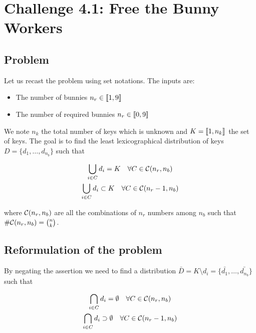 \documentclass[12pt]{article}
\begin{document}
\maketitle


\section{Challenge 4.1: Free the Bunny Workers}

\subsection{Problem}

Let us recast the problem using set notations. The inputs are:

\begin{itemize}
    \item The number of bunnies $n_r \in \llbracket 1, 9 \rrbracket$
    \item The number of required bunnies $n_r \in \llbracket 0, 9 \rrbracket$
\end{itemize}

We note $n_k$ the total number of keys which is unknown and $K = \llbracket 1, n_k \rrbracket$ the set of keys. The goal is to find the least lexicographical distribution of keys $D = \{d_1, \ldots, d_{n_b}\}$ such that

\begin{gather}
    \bigcup_{i \in C} d_i = K \quad \forall C \in \mathcal{C}(n_r, n_b) \\
    \bigcup_{i \in C} d_i \subset K \quad \forall C \in \mathcal{C}(n_r - 1, n_b)
\end{gather}

\noindent where $\mathcal{C}(n_r, n_b)$ are all the combinations of $n_r$ numbers among $n_b$ such that $\#\mathcal{C}(n_r, n_b) = \binom{n}{k}$.

\subsection{Reformulation of the problem}

By negating the assertion we need to find a distribution $\bar{D} = {K \setminus d_i} = \{\bar{d_1}, \ldots, \bar{d_{n_b}}\}$ such that

\begin{gather}
    \bigcap_{i \in C} d_i = \emptyset \quad \forall C \in \mathcal{C}(n_r, n_b) \\
    \bigcap_{i \in C} d_i \supset \emptyset \quad \forall C \in \mathcal{C}(n_r - 1, n_b)
\end{gather}
\end{document}
